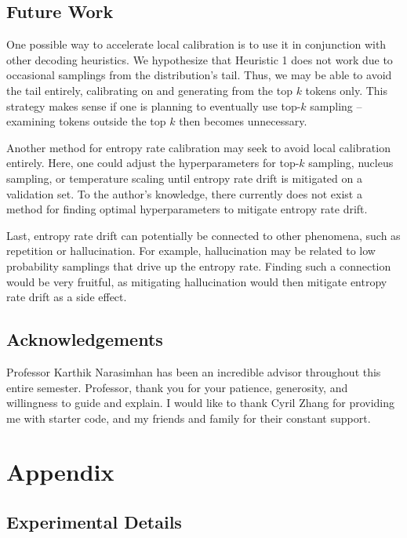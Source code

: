 \documentclass[pageno]{jpaper}
\begin{document}
\subsection{Future Work}

One possible way to accelerate local calibration is to use it in conjunction with other decoding heuristics. We hypothesize that Heuristic 1 does not work due to occasional samplings from the distribution's tail. Thus, we may be able to avoid the tail entirely, calibrating on and generating from the top $k$ tokens only. This strategy makes sense if one is planning to eventually use top-$k$ sampling -- examining tokens outside the top $k$ then becomes unnecessary. 

Another method for entropy rate calibration may seek to avoid local calibration entirely. Here, one could adjust the hyperparameters for top-$k$ sampling, nucleus sampling, or temperature scaling until entropy rate drift is mitigated on a validation set. To the author's knowledge, there currently does not exist a method for finding optimal hyperparameters to mitigate entropy rate drift. 

Last, entropy rate drift can potentially be connected to other phenomena, such as repetition or hallucination. For example, hallucination may be related to low probability samplings that drive up the entropy rate. Finding such a connection would be very fruitful, as mitigating hallucination would then mitigate entropy rate drift as a side effect.

\subsection{Acknowledgements}

Professor Karthik Narasimhan has been an incredible advisor throughout this entire semester. Professor, thank you for your patience, generosity, and willingness to guide and explain. I would like to thank Cyril Zhang for providing me with starter code, and my friends and family for their constant support.




\section{Appendix}
\subsection{Experimental Details}
\end{document}
